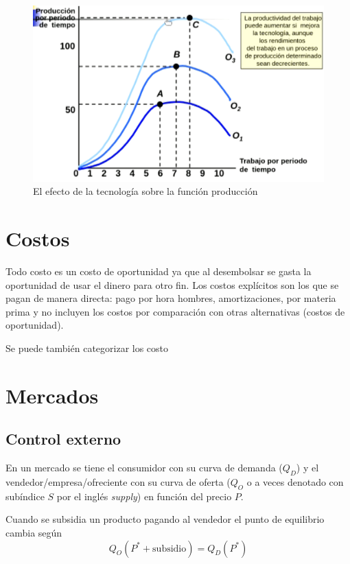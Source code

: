 \documentclass[twocolumn,10pt]{article}
\begin{document}
\begin{figure}[tbh!]
	\centering
	\includegraphics[width=1\linewidth]{fig/efectomejoratecnologiaMalthus}
	\caption{El efecto de la tecnolog\'ia sobre la funci\'on producción}
	\label{fig:efectomejoratecnologiamalthus}
\end{figure}

\section{Costos}

Todo costo es un costo de oportunidad ya que al desembolsar se gasta la oportunidad de usar el dinero para otro fin. Los costos explícitos son los que se pagan de manera directa: pago por hora hombres, amortizaciones, por materia prima y no incluyen los costos por comparaci\'on con otras alternativas (costos de oportunidad).

Se puede tambi\'en categorizar los costo

\section{Mercados}
\subsection{Control externo}

En un mercado se tiene el consumidor con su curva de demanda ($Q_D$) y el vendedor/empresa/ofreciente con su curva de oferta ($Q_O$ o a veces denotado con sub\'indice $S$ por el ingl\'es \emph{supply}) en funci\'on del precio $P$.

Cuando se subsidia un producto pagando al vendedor el punto de equilibrio cambia seg\'un
\[
Q_O(P^{*}+\text{subsidio}) = Q_D(P^{*}) 
\]
\end{document}
